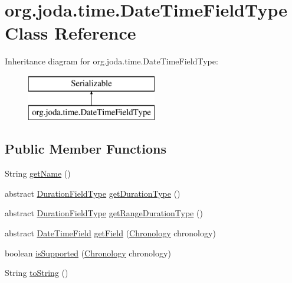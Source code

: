 \hypertarget{classorg_1_1joda_1_1time_1_1_date_time_field_type}{\section{org.\-joda.\-time.\-Date\-Time\-Field\-Type Class Reference}
\label{classorg_1_1joda_1_1time_1_1_date_time_field_type}
}
Inheritance diagram for org.\-joda.\-time.\-Date\-Time\-Field\-Type\-:\begin{figure}[H]
\begin{center}
\leavevmode
\includegraphics[height=2.000000cm]{classorg_1_1joda_1_1time_1_1_date_time_field_type}
\end{center}
\end{figure}
\subsection*{Public Member Functions}
\begin{DoxyCompactItemize}
\item 
String \hyperlink{classorg_1_1joda_1_1time_1_1_date_time_field_type_a3fdfbeb296de93d3f4c8f7c711b26ea1}{get\-Name} ()
\item 
abstract \hyperlink{classorg_1_1joda_1_1time_1_1_duration_field_type}{Duration\-Field\-Type} \hyperlink{classorg_1_1joda_1_1time_1_1_date_time_field_type_a317e3e415d03c28999f9de26726e1433}{get\-Duration\-Type} ()
\item 
abstract \hyperlink{classorg_1_1joda_1_1time_1_1_duration_field_type}{Duration\-Field\-Type} \hyperlink{classorg_1_1joda_1_1time_1_1_date_time_field_type_a877fe88a9fc388d979fc46916b1b9e3d}{get\-Range\-Duration\-Type} ()
\item 
abstract \hyperlink{classorg_1_1joda_1_1time_1_1_date_time_field}{Date\-Time\-Field} \hyperlink{classorg_1_1joda_1_1time_1_1_date_time_field_type_a8215ddcf8f87212827137cda2035c557}{get\-Field} (\hyperlink{classorg_1_1joda_1_1time_1_1_chronology}{Chronology} chronology)
\item 
boolean \hyperlink{classorg_1_1joda_1_1time_1_1_date_time_field_type_a71496e88d409d628578417c1b088474f}{is\-Supported} (\hyperlink{classorg_1_1joda_1_1time_1_1_chronology}{Chronology} chronology)
\item 
String \hyperlink{classorg_1_1joda_1_1time_1_1_date_time_field_type_ac91250d601e5850bdcf527feb83aebd8}{to\-String} ()
\end{DoxyCompactItemize}
